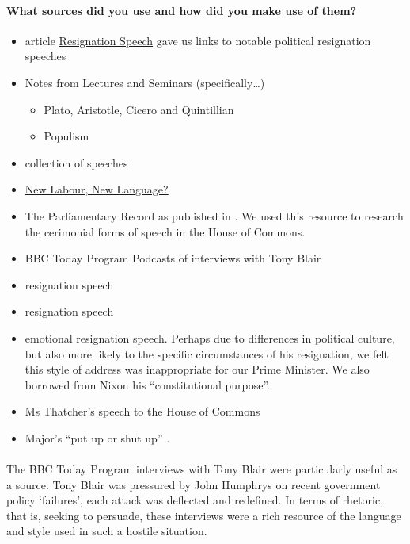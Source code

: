 \documentclass[12pt]{article}
\begin{document}
\begin{doublespace}
\paragraph{What sources did you use and how did you make use of them?}
\begin{itemize}
\item \cite{Wikipedia:fk} article \underline{Resignation Speech} gave us links to notable political resignation speeches
\item Notes from Lectures and Seminars (specifically\ldots)
\begin{itemize}
\item Plato, Aristotle, Cicero and Quintillian
\item Populism
\end{itemize}
\item {} collection of speeches
\item {} \underline{New Labour, New Language?} 
\item The Parliamentary Record as published in . We used this resource to research the cerimonial forms of speech in the House of Commons.
\item BBC Today Program Podcasts of interviews with Tony Blair \cite{interview:2007qf,interview:2007jk}
\item {} resignation speech 
\item {} resignation speech
\item {} emotional resignation speech. Perhaps due to differences in political culture, but also more likely to the specific circumstances of his resignation, we felt this style of address was inappropriate for our Prime Minister. We also borrowed from Nixon his ``constitutional purpose''.
\item Ms Thatcher's speech to the House of Commons
\item Major's ``put up or shut up'' \cite{Major:1995xy}.
\end{itemize}

\paragraph{}The BBC Today Program interviews with Tony Blair \cite{interview:2007qf,interview:2007jk} were particularly useful as a source. Tony Blair was pressured by John Humphrys on recent government policy `failures', each attack was deflected and redefined. In terms of rhetoric, that is, seeking to persuade, these interviews were a rich resource of the language and style used in such a hostile situation.


\end{doublespace}
\end{document}
